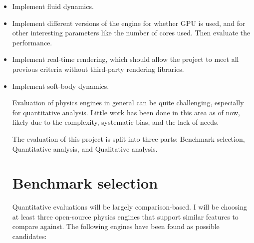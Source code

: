 \documentclass[runningheads]{llncs}
\begin{document}
\begin{itemize}
\item Implement fluid dynamics.

\item Implement different versions of the engine for whether GPU is used, and for other interesting parameters like the number of cores used. 
Then evaluate the performance.

\item Implement real-time rendering, which should allow the project to meet all previous criteria without third-party rendering libraries. 

\item Implement soft-body dynamics.


Evaluation of physics engines in general can be quite challenging, 
especially for quantitative analysis.
Little work has been done in this area as of now, 
likely due to the complexity, systematic bias, and the lack of needs.

The evaluation of this project is split into three parts: Benchmark selection, Quantitative analysis, and Qualitative analysis.

\section{Benchmark selection}

Quantitative evaluations will be largely comparison-based. 
I will be choosing at least three open-source physics engines that support similar features to compare against.
The following engines have been found as possible candidates:


\end{itemize}
\end{document}

